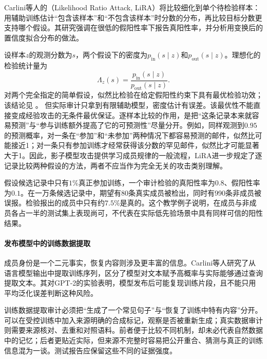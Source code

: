 Carlini等人的（Likelihood Ratio Attack, LiRA）将比较细化到单个待检验样本：用辅助训练估计“包含该样本”和“不包含该样本”时分数的分布，再比较目标分数更支持哪个假设。其研究强调在很低的假阳性率下报告真阳性率，并分析用变换后的置信度拟合分布的做法。

设样本$z$的观测分数为$s$，两个假设下的密度为$p_{\mathrm{in}}(s\mid z)$和$p_{\mathrm{out}}(s\mid z)$。理想化的检验统计量为
\begin{equation}
 \Lambda_z(s)=
 \frac{p_{\mathrm{in}}(s\mid z)}
      {p_{\mathrm{out}}(s\mid z)}.
 \label{eq:privacy-membership-likelihood}
\end{equation}
对两个完全指定的简单假设，似然比检验在给定假阳性约束下具有最优检验功效；该结论见
。
但实际审计只拿到有限辅助模型，密度估计有误差。该最优性不能直接变成经验攻击的无条件最优保证。逐样本比较的作用，是把“这条记录本来就容易预测”与“参与训练额外提高了它的可预测性”尽量分开。例如，同样观测到$0.95$的预测概率，对一条在“参加”和“未参加”两种情况下都容易预测的邮件，似然比可能接近1；对一条只有参加训练才经常获得该分数的罕见邮件，似然比才可能显著大于1。因此，影子模型攻击提供学习成员规律的一般流程，LiRA进一步规定了逐记录比较两种假设的方法，两者不应当作为完全无关的攻击类别理解。

\begin{example}[成员先验改变结果的含义]
\label{ex:privacy-membership-prior}
假设候选记录中只有$1\%$真正参加训练，一个审计检验的真阳性率为$0.8$、假阳性率为$0.1$。在一万条候选记录中，期望有80条真实成员被检出，同时有990条非成员被误报。检验报出的成员中只有约$7.5\%$是真的。这个教学例子说明，在成员与非成员各占一半的测试集上表现尚可，不代表在实际低先验场景中具有同样可信的阳性结果。
\end{example}

\paragraph{发布模型中的训练数据提取}

成员身份是一个二元事实，恢复内容则涉及更丰富的信息。Carlini等人研究了从语言模型输出中提取训练序列，区分了模型对文本赋予高概率与实际能够通过查询提取文本。其对GPT-2的实验表明，模型发布后可能复现训练片段，且不能只用平均泛化误差判断这种风险。

训练数据提取审计必须把“生成了一个常见句子”与“恢复了训练中特有内容”分开。可以在受控训练中加入来源明确的合成标记，观察是否被重新生成；真实数据审计则需要来源核对、去重和对照语料。前者便于比较不同机制，却未必代表自然数据中的记忆；后者更贴近实际，但来源不完整时容易把公开重合、猜测与真正的训练信息混为一谈。测试报告应保留这些不同的证据强度。

